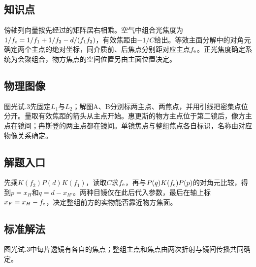 \documentclass[UTF8,fontset=fandol,a4paper,11pt]{ctexart}
\begin{document}


\subsection*{知识点}

傍轴列向量按先经过的矩阵居右相乘。空气中组合光焦度为$1/f_{\rm e}=1/f_1+1/f_2-d/(f_1f_2)$，有效焦距由$-1/C$给出。等效主面分解中的对角元确定两个主点的绝对坐标，同介质前、后焦点分别距对应主点$f_{\rm e}$。正光焦度确定系统为会聚组合，物方焦点的空间位置另由主面位置决定。



\subsection*{物理图像}

图光试.3先固定$L_1$与$L_2$；解图A、B分别标两主点、两焦点，并用引线把密集点位分开。量取有效焦距的箭头从主点开始。惠更斯的物方主点位于第二镜后，像方主点在镜间；冉斯登的两主点都在镜间。单镜焦点与整组焦点各自标识，名称由对应物像关系确定。



\subsection*{解题入口}

先乘$K(f_2)P(d)K(f_1)$，读取$C$求$f_{\rm e}$，再与$P(q)K(f_{\rm e})P(p)$的对角元比较，得到$p=x_H$和$q=d-x_{H'}$。两种目镜仅在此后代入参数，最后在轴上标$x_F=x_H-f_{\rm e}$，决定整组前方的实物能否靠近物方焦面。



\subsection*{标准解法}


图光试.3中每片透镜有各自的焦点；整组主点和焦点由两次折射与镜间传播共同确定。
\end{document}
